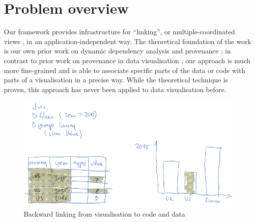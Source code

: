 \section{Problem overview}
\label{sec:problem-overview}

Our framework provides infrastructure for ``linking'', or multiple-coordinated
views \cite{tobiasz09}, in an application-independent way. The theoretical
foundation of the work is our own prior work on dynamic dependency analysis and
provenance \cite{perera16d, ricciotti17}; in contrast to prior work on
provenance in data visualisation \cite{callahan06}, our approach is much more
fine-grained and is able to associate specific parts of the data or code with
parts of a visualisation in a precise way. While the theoretical technique is
proven, this approach has never been applied to data visualisation before.

\begin{figure}[H]
\includegraphics[scale=0.35]{image/chart-bwd}
\caption{Backward linking from visualisation to code and data}
\end{figure}
